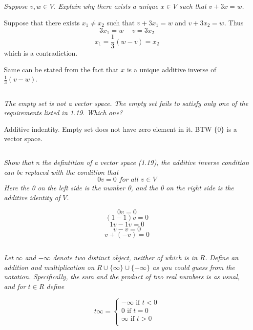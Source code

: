 \documentclass[11pt,oneside,titlepage]{book}
\begin{document}
\subsection{}
\textit{Suppose $v, w \in V$. Explain why there exists a unique $x \in V$
  such that $v + 3x = w$.}

Suppose that there exists $x_1 \neq x_2$ such that
$v + 3x_1 = w$ and $v + 3x_2 = w$. Thus
$$3x_1 = w - v = 3x_2$$
$$x_1 = \frac{1}{3}(w - v) = x_2$$
which is a contradiction.

Same can be stated from the fact that $x$ is a unique additive inverse of
$\frac{1}{3}(v - w)$.

\subsection{}
\textit{The empty set is not a vector space. The empty set fails to satisfy
  only one of the requirements listed in 1.19. Which one?}

Additive indentity. Empty set does not have zero element in it.
BTW $\{0\}$ is a vector space.

\subsection{}
\textit{Show that n the defintition of a vector space (1.19), the additive
  inverse condition can be replaced with the condition that}
$$0v = 0 \textit{ for all } v \in V$$
\textit{Here the 0 on the left side is the number 0, and the 0 on the right
  side is the additive identity of $V$.}

$$0v = 0$$
$$(1 - 1)v = 0$$
$$1v - 1v = 0$$
$$v - v= 0$$
$$v + (- v)= 0$$

\subsection{}
\textit{Let $\infty$ and $-\infty$ denote two distinct object, neither of
  which is in $R$. Define an addition and multiplication on
  $R \cup \{\infty\} \cup \{-\infty\}$ as you could guess from the notation.
  Specifically, the sum and the product of two real numbers is as usual,
  and for $t \in R$ define
}

$$
t\infty =
\begin{cases}
  -\infty \text{ if } t < 0 \\
  0 \text{ if } t = 0 \\
  \infty \text{ if } t > 0 \\
\end{cases}
$$
\end{document}
